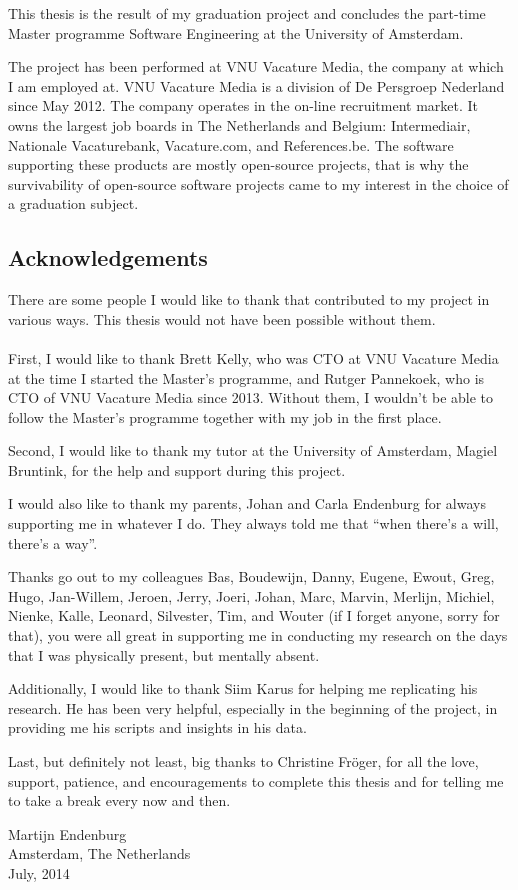 This thesis is the result of my graduation project and concludes the part-time
Master programme Software Engineering at the University of Amsterdam.

The project has been performed at VNU Vacature Media, the company at which I am
employed at. VNU Vacature Media is a division of De Persgroep Nederland since
May 2012. The company operates in the on-line recruitment market. It owns the
largest job boards in The Netherlands and Belgium: Intermediair,
Nationale Vacaturebank, Vacature.com, and References.be. The software
supporting these products are mostly open-source projects, that is why the
survivability of open-source software projects came to my interest in the choice
of a graduation subject.

\subsection*{Acknowledgements}
There are some people I would like to thank that contributed to my project
in various ways. This thesis would not have been possible without them.

\paragraph{}
First, I would like to thank Brett Kelly, who was CTO at VNU Vacature Media at
the time I started the Master's programme, and Rutger Pannekoek, who is CTO of
VNU Vacature Media since 2013. Without them, I wouldn't be able to follow the
Master's programme together with my job in the first place.

Second, I would like to thank my tutor at the University of Amsterdam, Magiel
Bruntink, for the help and support during this project.

I would also like to thank my parents, Johan and Carla Endenburg for always
supporting me in whatever I do. They always told me that ``when there's a will,
there's a way''.

Thanks go out to my colleagues
Bas,
Boudewijn,
Danny,
Eugene,
Ewout,
Greg,
Hugo,
Jan-Willem,
Jeroen,
Jerry,
Joeri,
Johan,
Marc,
Marvin,
Merlijn,
Michiel,
Nienke,
Kalle,
Leonard,
Silvester,
Tim,
and Wouter
(if I forget anyone, sorry for that), you were all great in supporting me in
conducting my research on the days that I was physically present, but mentally
absent.

Additionally, I would like to thank Siim Karus for helping me replicating his
research. He has been very helpful, especially in the beginning of the project,
in providing me his scripts and insights in his data.

Last, but definitely not least, big thanks to Christine Fr\"{o}ger, for all the
love, support, patience, and encouragements to complete this thesis and for
telling me to take a break every now and then.\\[2em]

\begin{flushright}
Martijn Endenburg\\
Amsterdam, The Netherlands\\
July, 2014
\end{flushright}
